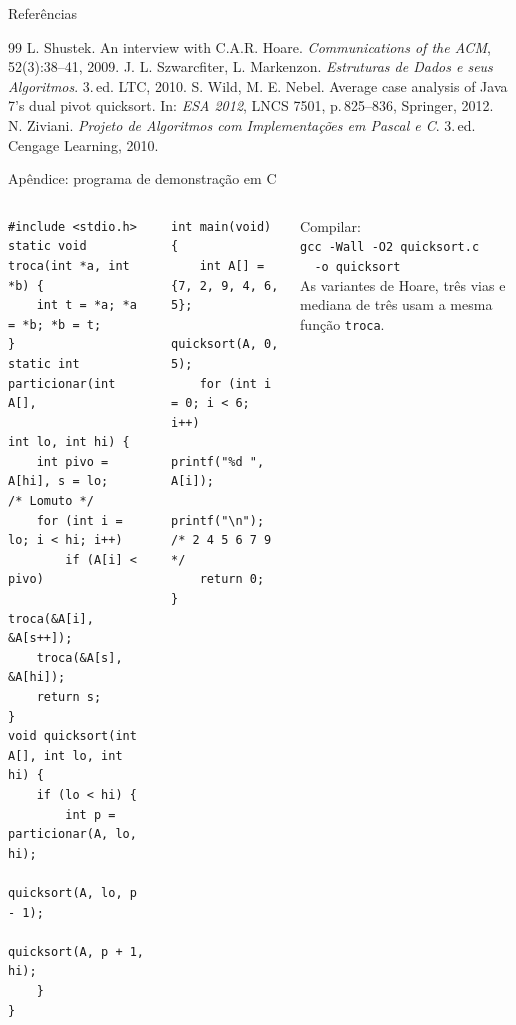 \documentclass[aspectratio=169,10pt]{beamer}
\begin{document}
\begin{frame}[allowframebreaks]{Referências}
\begin{thebibliography}{99}
   L. Shustek. An interview with C.A.R. Hoare. \emph{Communications of the ACM}, 52(3):38--41, 2009.
   J. L. Szwarcfiter, L. Markenzon. \emph{Estruturas de Dados e seus Algoritmos}. 3.\,ed. LTC, 2010.
   S. Wild, M. E. Nebel. Average case analysis of Java 7's dual pivot quicksort. In: \emph{ESA 2012}, LNCS 7501, p.\,825--836, Springer, 2012.
   N. Ziviani. \emph{Projeto de Algoritmos com Implementações em Pascal e C}. 3.\,ed. Cengage Learning, 2010.
 \end{thebibliography}
\end{frame}

\begin{frame}[fragile]{Apêndice: programa de demonstração em C}
 \begin{columns}[T]
\begin{lstlisting}[style=code]
#include <stdio.h>
static void troca(int *a, int *b) {
    int t = *a; *a = *b; *b = t;
}
static int particionar(int A[],
                       int lo, int hi) {
    int pivo = A[hi], s = lo;     /* Lomuto */
    for (int i = lo; i < hi; i++)
        if (A[i] < pivo)
            troca(&A[i], &A[s++]);
    troca(&A[s], &A[hi]);
    return s;
}
void quicksort(int A[], int lo, int hi) {
    if (lo < hi) {
        int p = particionar(A, lo, hi);
        quicksort(A, lo, p - 1);
        quicksort(A, p + 1, hi);
    }
}
\end{lstlisting}
\begin{lstlisting}[style=code]
int main(void) {
    int A[] = {7, 2, 9, 4, 6, 5};
    quicksort(A, 0, 5);
    for (int i = 0; i < 6; i++)
        printf("%d ", A[i]);
    printf("\n"); /* 2 4 5 6 7 9 */
    return 0;
}
\end{lstlisting}
   \vspace{0.6em}
   {\scriptsize Compilar:\\ \texttt{gcc -Wall -O2 quicksort.c}\\ \texttt{\ \ -o quicksort}\\[0.8ex]
   As variantes de Hoare, três vias e mediana de três usam a mesma função \texttt{troca}.}
 \end{columns}
\end{frame}
\end{document}
